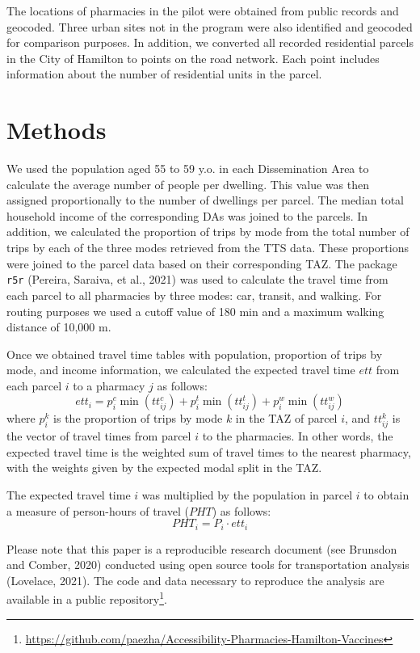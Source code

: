 \documentclass[]{elsarticle} %
\begin{document}
The locations of pharmacies in the pilot were obtained from public
records and geocoded. Three urban sites not in the program were also
identified and geocoded for comparison purposes. In addition, we
converted all recorded residential parcels in the City of Hamilton to
points on the road network. Each point includes information about the
number of residential units in the parcel.

\hypertarget{methods}{%
\section{Methods}\label{methods}}

We used the population aged 55 to 59 y.o. in each Dissemination Area to
calculate the average number of people per dwelling. This value was then
assigned proportionally to the number of dwellings per parcel. The
median total household income of the corresponding DAs was joined to the
parcels. In addition, we calculated the proportion of trips by mode from
the total number of trips by each of the three modes retrieved from the
TTS data. These proportions were joined to the parcel data based on
their corresponding TAZ. The package \texttt{r5r} (Pereira, Saraiva, et
al., 2021) was used to calculate the travel time from each parcel to all
pharmacies by three modes: car, transit, and walking. For routing
purposes we used a cutoff value of 180 min and a maximum walking
distance of 10,000 m.

Once we obtained travel time tables with population, proportion of trips
by mode, and income information, we calculated the expected travel time
\(ett\) from each parcel \(i\) to a pharmacy \(j\) as follows: \[
ett_i = p^c_i \min(tt^c_{ij}) + p^t_i \min(tt^t_{ij}) + p^w_i \min(tt^w_{ij})
\] \noindent where \(p^k_i\) is the proportion of trips by mode \(k\) in
the TAZ of parcel \(i\), and \(tt^k_{ij}\) is the vector of travel times
from parcel \(i\) to the pharmacies. In other words, the expected travel
time is the weighted sum of travel times to the nearest pharmacy, with
the weights given by the expected modal split in the TAZ.

The expected travel time \(i\) was multiplied by the population in
parcel \(i\) to obtain a measure of person-hours of travel (\(PHT\)) as
follows: \[
PHT_i = P_i\cdot ett_i
\]

Please note that this paper is a reproducible research document (see
Brunsdon and Comber, 2020) conducted using open source tools for
transportation analysis (Lovelace, 2021). The code and data necessary to
reproduce the analysis are available in a public
repository\footnote{\url{https://github.com/paezha/Accessibility-Pharmacies-Hamilton-Vaccines}}.
\end{document}
